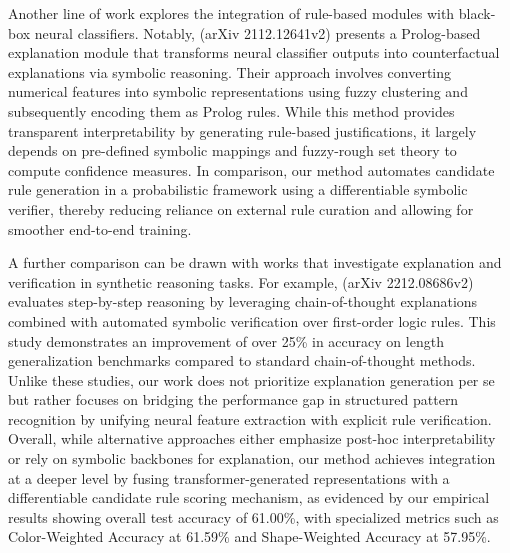 \documentclass{article}
\begin{document}
Another line of work explores the integration of rule-based modules with black-box neural classifiers. Notably, (arXiv 2112.12641v2) presents a Prolog-based explanation module that transforms neural classifier outputs into counterfactual explanations via symbolic reasoning. Their approach involves converting numerical features into symbolic representations using fuzzy clustering and subsequently encoding them as Prolog rules. While this method provides transparent interpretability by generating rule-based justifications, it largely depends on pre-defined symbolic mappings and fuzzy-rough set theory to compute confidence measures. In comparison, our method automates candidate rule generation in a probabilistic framework using a differentiable symbolic verifier, thereby reducing reliance on external rule curation and allowing for smoother end-to-end training.

A further comparison can be drawn with works that investigate explanation and verification in synthetic reasoning tasks. For example, (arXiv 2212.08686v2) evaluates step-by-step reasoning by leveraging chain-of-thought explanations combined with automated symbolic verification over first-order logic rules. This study demonstrates an improvement of over 25\% in accuracy on length generalization benchmarks compared to standard chain-of-thought methods. Unlike these studies, our work does not prioritize explanation generation per se but rather focuses on bridging the performance gap in structured pattern recognition by unifying neural feature extraction with explicit rule verification. Overall, while alternative approaches either emphasize post-hoc interpretability or rely on symbolic backbones for explanation, our method achieves integration at a deeper level by fusing transformer-generated representations with a differentiable candidate rule scoring mechanism, as evidenced by our empirical results showing overall test accuracy of 61.00\%, with specialized metrics such as Color-Weighted Accuracy at 61.59\% and Shape-Weighted Accuracy at 57.95\%.
\end{document}
